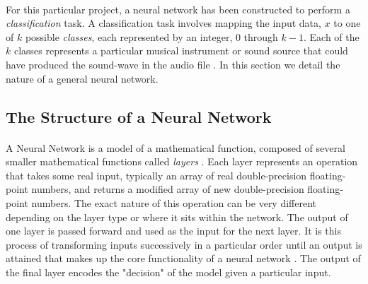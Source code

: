 \documentclass[12pt,letterpaper]{article}
\begin{document}
\paragraph*{}For this particular project, a neural network has been constructed to perform a \textit{classification} task. A classification task involves mapping the input data, $x$ to one of $k$ possible \textit{classes}, each represented by an integer, $0$ through $k-1$. Each of the $k$ classes represents a particular musical instrument or sound source that could have produced the sound-wave in the audio file \cite{Goodfellow,Loy,Virtanen}. In this section we detail the nature of a general neural network. 


\subsection{The Structure of a Neural Network}
\label{subsec-NetworkStructure}

\paragraph*{}A Neural Network is a model of a mathematical function, composed of several smaller mathematical functions called \textit{layers} \cite{Goodfellow,Loy}. Each layer represents an operation that takes some real input, typically an array of real double-precision floating-point numbers, and returns a modified array of new double-precision floating-point numbers. The exact nature of this operation can be very different depending on the layer type or where it sits within the network. The output of one layer is passed forward and used as the input for the next layer. It is this process of transforming inputs successively in a particular order until an output is attained that makes up the core functionality of a neural network \cite{Geron,Loy}. The output of the final layer encodes the "decision" of the model given a particular input.
\end{document}
